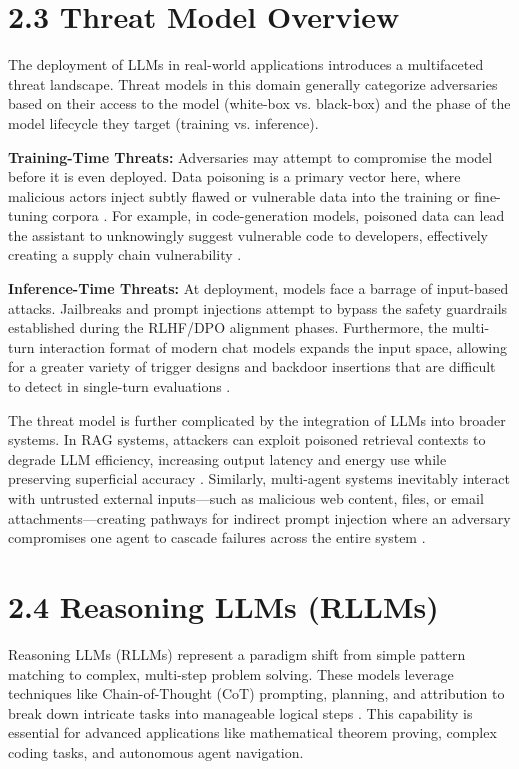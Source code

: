 \documentclass[11pt,a4paper]{article}
\begin{document}
\section{2.3 Threat Model Overview}

The deployment of LLMs in real-world applications introduces a multifaceted threat landscape. Threat models in this domain generally categorize adversaries based on their access to the model (white-box vs. black-box) and the phase of the model lifecycle they target (training vs. inference).

\textbf{Training-Time Threats:} Adversaries may attempt to compromise the model before it is even deployed. Data poisoning is a primary vector here, where malicious actors inject subtly flawed or vulnerable data into the training or fine-tuning corpora \cite{Rubel_2024_LLM}. For example, in code-generation models, poisoned data can lead the assistant to unknowingly suggest vulnerable code to developers, effectively creating a supply chain vulnerability \cite{Rubel_2024_LLM}. 

\textbf{Inference-Time Threats:} At deployment, models face a barrage of input-based attacks. Jailbreaks and prompt injections attempt to bypass the safety guardrails established during the RLHF/DPO alignment phases. Furthermore, the multi-turn interaction format of modern chat models expands the input space, allowing for a greater variety of trigger designs and backdoor insertions that are difficult to detect in single-turn evaluations \cite{Hao_2024_Exploring}. 

The threat model is further complicated by the integration of LLMs into broader systems. In RAG systems, attackers can exploit poisoned retrieval contexts to degrade LLM efficiency, increasing output latency and energy use while preserving superficial accuracy . Similarly, multi-agent systems inevitably interact with untrusted external inputs---such as malicious web content, files, or email attachments---creating pathways for indirect prompt injection where an adversary compromises one agent to cascade failures across the entire system .

\section{2.4 Reasoning LLMs (RLLMs)}

Reasoning LLMs (RLLMs) represent a paradigm shift from simple pattern matching to complex, multi-step problem solving. These models leverage techniques like Chain-of-Thought (CoT) prompting, planning, and attribution to break down intricate tasks into manageable logical steps \cite{Wang_2024_LLM}. This capability is essential for advanced applications like mathematical theorem proving, complex coding tasks, and autonomous agent navigation.
\end{document}
